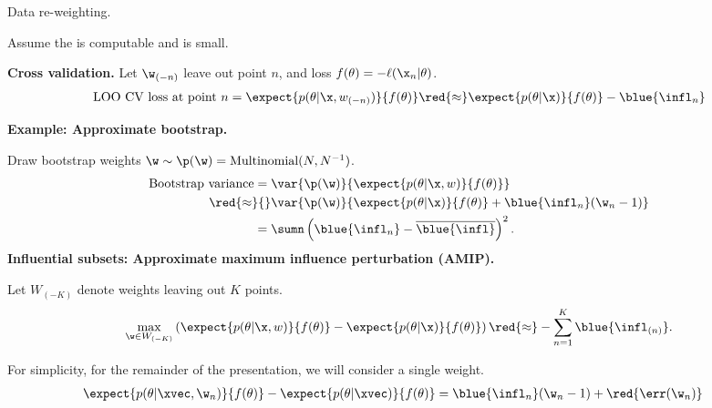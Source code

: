 



\begin{frame}[t]{Data re-weighting.}

    
    Assume the  is computable and  is small.
    \expansion{}
    
    
    \pause
    \textbf{Cross validation.} 
    Let $\w_{(-n)}$ leave out point $n$, and loss
    $f(\theta) = -\ell(\x_n \vert \theta)$.
    \begin{align*}
    \textrm{LOO CV loss at point }n =
        \expect{p(\theta \vert \x, w_{(-n)})}{f(\theta)}
    \red{\approx} 
        \expect{p(\theta \vert \x)}{f(\theta)} - \blue{\infl_{n}}
    \end{align*}
    
    
    
    \pause
    \textbf{Example: Approximate bootstrap.}
    
    Draw bootstrap
    weights $\w \sim \p(\w) = \textrm{Multinomial}(N, N^{-1})$.
    \begin{align*}
    \textrm{Bootstrap variance} ={}&
    \var{\p(\w)}{\expect{p(\theta \vert \x, w)}{f(\theta)}} 
    \\\red{\approx}{}&
      \var{\p(\w)}{\expect{p(\theta \vert \x)}{f(\theta)} + \blue{\infl_n}(\w_n - 1)} 
    \\={}& \sumn \left(\blue{\infl_n} - \overline{\blue{\infl}}\right)^2.
    \end{align*}
    \pause
    \textbf{Influential subsets:
    Approximate maximum influence perturbation (AMIP).}
    
    Let $W_{(-K)}$ denote weights leaving out $K$ points.
    \begin{align*}
    \max_{\w \in W_{(-K)}} \left(
    \expect{p(\theta \vert \x, w)}{f(\theta)} -
    \expect{p(\theta \vert \x)}{f(\theta)}
    \right) \red{\approx} - \sum_{n=1}^K \blue{\infl_{(n)}}.
    \end{align*}
    
    
    
    
    
    For simplicity, for the remainder of the presentation, we will
    consider a single weight.
    \begin{align*}
    \expect{p(\theta \vert \xvec, \w_n)}{f(\theta)} -
        \expect{p(\theta \vert \xvec)}{f(\theta)} ={}&
        \blue{\infl_n} (\w_n - 1) + \red{\err(\w_n)}
    \end{align*}
    
    \end{frame}
    

